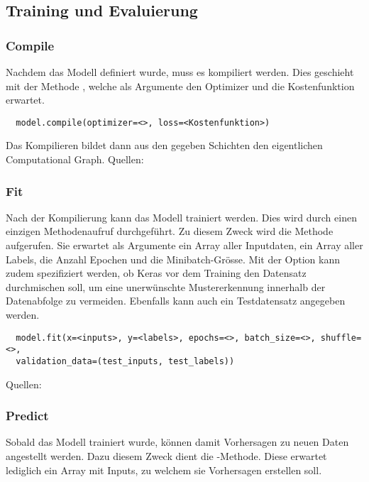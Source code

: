 \subsection{Training und Evaluierung}

\subsubsection{Compile}
Nachdem das Modell definiert wurde, muss es kompiliert werden.
Dies geschieht mit der Methode , welche als
Argumente den Optimizer und die Kostenfunktion erwartet.
\begin{verbatim}
  model.compile(optimizer=<>, loss=<Kostenfunktion>)
\end{verbatim}
Das Kompilieren bildet dann aus den gegeben Schichten den eigentlichen
Computational Graph.
\para{}
Quellen: \cite{net:keras_docs} \cite{net:tf_docs}

\subsubsection{Fit}
Nach der Kompilierung kann das Modell trainiert werden. Dies wird durch einen
einzigen Methodenaufruf durchgeführt. Zu diesem Zweck wird die  Methode aufgerufen.
Sie erwartet als Argumente ein Array aller Inputdaten, ein Array
aller Labels, die Anzahl Epochen und die Minibatch-Grösse.
Mit der Option  kann zudem spezifiziert werden, ob Keras vor dem
Training den Datensatz durchmischen soll, um eine unerwünschte Mustererkennung innerhalb der
Datenabfolge zu vermeiden.
Ebenfalls kann auch ein Testdatensatz angegeben werden.
\begin{verbatim}
  model.fit(x=<inputs>, y=<labels>, epochs=<>, batch_size=<>, shuffle=<>,
  validation_data=(test_inputs, test_labels))
\end{verbatim}
\para{}
Quellen: \cite{net:keras_docs} \cite{net:tf_docs}

\subsubsection{Predict}
Sobald das Modell trainiert wurde, können damit Vorhersagen zu neuen Daten
angestellt werden. Dazu diesem Zweck dient die -Methode. Diese
erwartet lediglich ein Array mit Inputs, zu welchem sie Vorhersagen erstellen soll.

